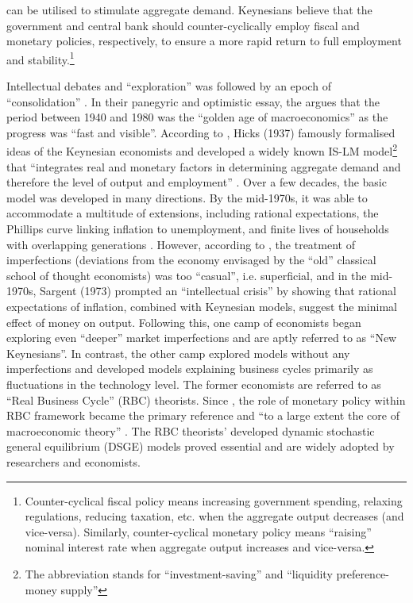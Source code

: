 can be utilised to stimulate aggregate demand. Keynesians believe that the government and central bank should counter-cyclically employ fiscal and monetary policies, respectively, to ensure a more rapid return to full employment and stability.\footnote{Counter-cyclical fiscal policy means increasing government spending, relaxing regulations, reducing taxation, etc. when the aggregate output decreases (and vice-versa). Similarly, counter-cyclical monetary policy means ``raising'' nominal interest rate when aggregate output increases and vice-versa.}

Intellectual debates and ``exploration'' was followed by an epoch of ``consolidation'' \textcite{blanchard_2000_what}. In their panegyric and optimistic essay, the \citereset\textcite{blanchard_2000_what} argues that the period between 1940 and 1980 was the ``golden age of macroeconomics'' \parencite[1379]{blanchard_2000_what} as the progress was ``fast and visible''. According to \textcites[90]{snowdon_1994_a}[1379]{blanchard_2000_what}, Hicks (1937) famously formalised ideas of the Keynesian economists and developed a widely known IS-LM model\footnote{The abbreviation stands for ``investment-saving'' and ``liquidity preference-money supply''} that ``integrates real and monetary factors in determining aggregate demand and therefore the level of output and employment'' \parencite[90]{snowdon_1994_a}. Over a few decades, the basic model was developed in many directions. By the mid-1970s, it was able to accommodate a multitude of extensions, including rational expectations, the Phillips curve linking inflation to unemployment, and finite lives of households with overlapping generations \parencite[1382]{blanchard_2000_what}. However, according to \citereset\textcite[1382]{blanchard_2000_what}, the treatment of imperfections (deviations from the economy envisaged by the ``old'' classical school of thought economists) was too ``casual'', i.e. superficial, and in the mid-1970s, Sargent (1973) prompted an ``intellectual crisis'' \parencite[1382]{blanchard_2000_what} by showing that rational expectations of inflation, combined with Keynesian models, suggest the minimal effect of money on output. Following this, one camp of economists began exploring even ``deeper'' market imperfections and are aptly referred to as ``New Keynesians''. In contrast, the other camp explored models without any imperfections and developed models explaining business cycles primarily as fluctuations in the technology level. The former economists are referred to as ``Real Business Cycle'' (RBC) theorists. Since \textcites{kydland_1982_time}{prescott_1986_theory}, the role of monetary policy within RBC framework became the primary reference and ``to a large extent the core of macroeconomic theory'' \parencite[2]{jordigal_2015_monetary}. The RBC theorists' developed dynamic stochastic general equilibrium (DSGE) models proved essential and are widely adopted by researchers and economists.

